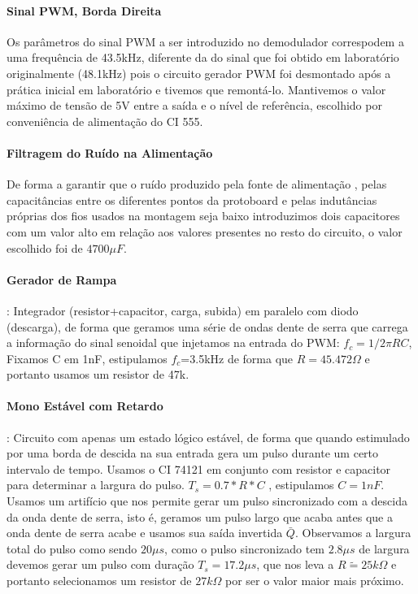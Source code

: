 \paragraph{Sinal PWM, Borda Direita}Os parâmetros do sinal PWM a ser introduzido no demodulador correspodem a uma frequência de 43.5kHz, diferente da do sinal que foi obtido em laboratório originalmente (48.1kHz) pois o circuito gerador PWM foi desmontado após a prática inicial em laboratório e tivemos que remontá-lo. Mantivemos o valor máximo de tensão de 5V entre a saída e o nível de referência, escolhido por conveniência de alimentação do CI 555. 

\paragraph{Filtragem do Ruído na Alimentação} De forma a garantir que o ruído produzido pela fonte de alimentação , pelas capacitâncias entre os diferentes pontos da protoboard e pelas indutâncias próprias dos fios usados na montagem seja baixo introduzimos dois capacitores com um valor alto em relação aos valores presentes no resto do circuito, o valor escolhido foi de $4700\mu F$.
 
\paragraph{Gerador de Rampa}: Integrador (resistor+capacitor, carga, subida) em paralelo com diodo (descarga), de forma que geramos uma série de ondas dente de serra que carrega a informação do sinal senoidal que injetamos na entrada do PWM: 
%  
$f_c=1/2\pi RC$,
Fixamos C em 1nF, estipulamos $f_c$=3.5kHz de forma que $R=45.472 \Omega$ e portanto usamos um resistor de 47k.

\paragraph{Mono Estável com Retardo}: Circuito com apenas um estado lógico estável, de forma que quando estimulado por uma borda de descida na sua entrada gera um pulso durante um certo intervalo de tempo. Usamos o CI 74121 em conjunto com resistor e capacitor para determinar a largura do pulso. $T_s= 0.7*R*C$ , estipulamos $C=1nF$. Usamos um artifício que nos permite gerar um pulso sincronizado com a descida da onda dente de serra, isto é, geramos um pulso largo que acaba antes que a onda dente de serra acabe e usamos sua saída invertida $\bar{Q}$. Observamos a largura total do pulso como sendo $20\mu s$, como o pulso sincronizado tem $2.8\mu s$ de largura devemos gerar um pulso com duração $T_s = 17.2\mu s$, que nos leva a 
$R   \tilde{=}  25k\Omega$ e portanto selecionamos um resistor de $27k\Omega$ por ser o valor maior mais próximo. 

